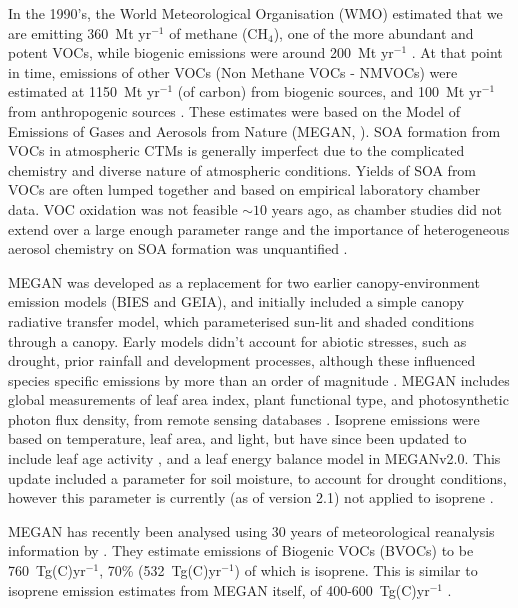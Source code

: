     In the 1990's, the World Meteorological Organisation (WMO) estimated that we are emitting 360~Mt yr$^{-1}$ of methane (CH$_4$), one of the more abundant and potent VOCs, while biogenic emissions were around 200~Mt yr$^{-1}$ \citep{Atkinson2000}.
    At that point in time, emissions of other VOCs (Non Methane VOCs - NMVOCs) were estimated at 1150~Mt yr$^{-1}$ (of carbon) from biogenic sources, and 100~Mt yr$^{-1}$ from anthropogenic sources \citep{Guenther1995, Atkinson2000}.
    These estimates were based on the Model of Emissions of Gases and Aerosols from Nature (MEGAN, \citet{Guenther1995}).
    SOA formation from VOCs in atmospheric CTMs is generally imperfect due to the complicated chemistry and diverse nature of atmospheric conditions.
    Yields of SOA from VOCs are often lumped together and based on empirical laboratory chamber data. 
    VOC oxidation was not feasible $\sim 10$ years ago,  as chamber studies did not extend over a large enough parameter range and the importance of heterogeneous aerosol chemistry on SOA formation was unquantified \citep{Kanakidou2005}.
    
    MEGAN was developed as a replacement for two earlier canopy-environment emission models (BIES and GEIA), and initially included a simple canopy radiative transfer model, which parameterised sun-lit and shaded conditions through a canopy.
    Early models didn't account for abiotic stresses, such as drought, prior rainfall and development processes, although these influenced species specific emissions by more than an order of magnitude \citep{Niinemets1999}.
    MEGAN includes global measurements of leaf area index, plant functional type, and photosynthetic photon flux density, from remote sensing databases \citep{Kefauver2014}.
    Isoprene emissions were based on temperature, leaf area, and light, but have since been updated to include leaf age activity \citep{Guenther2000}, and a leaf energy balance model \citep{Guenther2006} in MEGANv2.0.
    This update included a parameter for soil moisture, to account for drought conditions, however this parameter is currently (as of version 2.1) not applied to isoprene \citep{Sindelarova2014}.
    
    MEGAN has recently been analysed using 30 years of meteorological reanalysis information by \citet{Sindelarova2014}.
    They estimate emissions of Biogenic VOCs (BVOCs) to be 760~Tg(C)yr$^{-1}$, 70\% (532~Tg(C)yr$^{-1}$) of which is isoprene.
    This is similar to isoprene emission estimates from MEGAN itself, of 400-600~Tg(C)yr$^{-1}$ \citep{Guenther2006}.
    
